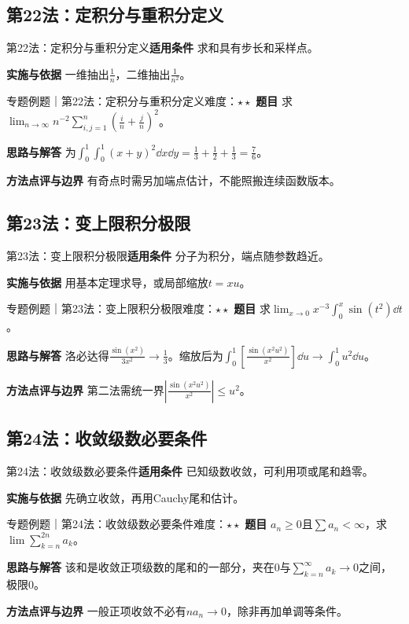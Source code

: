 \subsection{第22法：定积分与重积分定义}\label{mat:limits_35:k22}
\begin{method}{第22法：定积分与重积分定义}\textbf{适用条件} 求和具有步长和采样点。\par\textbf{实施与依据} 一维抽出$\frac{1}{n}$，二维抽出$\frac{1}{n^2}$。\end{method}
\begin{example}{专题例题｜第22法：定积分与重积分定义}{难度：$\star\star$}
\textbf{题目} 求$\lim_{n\to\infty}n^{-2}\sum_{i,j=1}^n(\frac{i}{n}+\frac{j}{n})^2$。\par\textbf{思路与解答} 为$\int_0^1\int_0^1(x+y)^2\dd x\dd y=\frac{1}{3}+\frac{1}{2}+\frac{1}{3}=\frac{7}{6}$。\par\textbf{方法点评与边界} 有奇点时需另加端点估计，不能照搬连续函数版本。
\end{example}
\subsection{第23法：变上限积分极限}\label{mat:limits_35:k23}
\begin{method}{第23法：变上限积分极限}\textbf{适用条件} 分子为积分，端点随参数趋近。\par\textbf{实施与依据} 用基本定理求导，或局部缩放$t=xu$。\end{method}
\begin{example}{专题例题｜第23法：变上限积分极限}{难度：$\star\star$}
\textbf{题目} 求$\lim_{x\to0}x^{-3}\int_0^x\sin(t^2)\dd t$。\par\textbf{思路与解答} 洛必达得$\frac{\sin(x^2)}{3x^2}\to\frac{1}{3}$。缩放后为$\int_0^1[\frac{\sin(x^2u^2)}{x^2}]\dd u\to\int_0^1u^2\dd u$。\par\textbf{方法点评与边界} 第二法需统一界$|\frac{\sin(x^2u^2)}{x^2}|\le u^2$。
\end{example}
\subsection{第24法：收敛级数必要条件}\label{mat:limits_35:k24}
\begin{method}{第24法：收敛级数必要条件}\textbf{适用条件} 已知级数收敛，可利用项或尾和趋零。\par\textbf{实施与依据} 先确立收敛，再用Cauchy尾和估计。\end{method}
\begin{example}{专题例题｜第24法：收敛级数必要条件}{难度：$\star\star$}
\textbf{题目} $a_n\ge0$且$\sum a_n<\infty$，求$\lim\sum_{k=n}^{2n}a_k$。\par\textbf{思路与解答} 该和是收敛正项级数的尾和的一部分，夹在0与$\sum_{k=n}^\infty a_k\to0$之间，极限0。\par\textbf{方法点评与边界} 一般正项收敛不必有$na_n\to0$，除非再加单调等条件。
\end{example}
